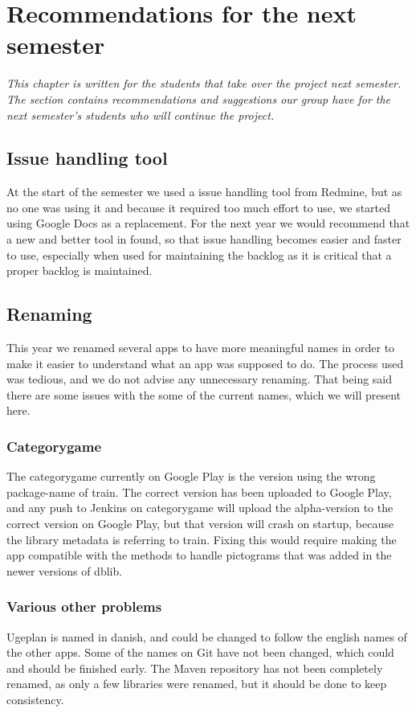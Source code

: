 \chapter{Recommendations for the next semester}
\textit{This chapter is written for the students that take over the project next semester. The section contains recommendations and suggestions our group have for the next semester’s students who will continue the project.}

\section{Issue handling tool}
At the start of the semester we used a issue handling tool from Redmine, but as no one was using it and because it required too much effort to use, we started using Google Docs as a replacement. For the next year we would recommend that a new and better tool in found, so that issue handling becomes easier and faster to use, especially when used for maintaining the backlog as it is critical that a proper backlog is maintained.

\section{Renaming}
This year we renamed several apps to have more meaningful names in order to make it easier to understand what an app was supposed to do. The process used was tedious, and we do not advise any unnecessary renaming. That being said there are some issues with the some of the current names, which we will present here.

\subsection{Categorygame}
The categorygame currently on Google Play is the version using the wrong package-name of train. The correct version has been uploaded to Google Play, and any push to Jenkins on categorygame will upload the alpha-version to the correct version on Google Play, but that version will crash on startup, because the library metadata is referring to train. Fixing this would require making the app compatible with the methods to handle pictograms that was added in the newer versions of dblib.

\subsection{Various other problems}
Ugeplan is named in danish, and could be changed to follow the english names of the other apps.
Some of the names on Git have not been changed, which could and should be finished early.
The Maven repository has not been completely renamed, as only a few libraries were renamed, but it should be done to keep consistency.

